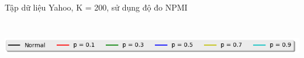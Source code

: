 \documentclass[pdf]{beamer}
\begin{document}
\begin{frame}{Tập dữ liệu Yahoo, K = 200, sử dụng độ đo NPMI }
\begin{columns}[T] %
\begin{column}{.50\textwidth}
\begin{figure}
\end{figure}
\end{column} %
\hfill%
\begin{column}{.50\textwidth}
\begin{figure}
\end{figure}				
\end{column} %
\end{columns}
\begin{center}
\includegraphics[width=1\textwidth]{menu.png}	
\end{center}
\end{frame}
\end{document}

